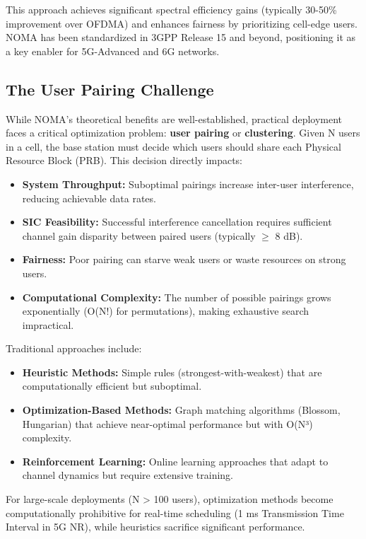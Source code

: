 This approach achieves significant spectral efficiency gains (typically 30-50\% improvement over OFDMA) and enhances fairness by prioritizing cell-edge users. NOMA has been standardized in 3GPP Release 15 and beyond, positioning it as a key enabler for 5G-Advanced and 6G networks.

\subsection{The User Pairing Challenge}

While NOMA's theoretical benefits are well-established, practical deployment faces a critical optimization problem: \textbf{user pairing} or \textbf{clustering}. Given N users in a cell, the base station must decide which users should share each Physical Resource Block (PRB). This decision directly impacts:

\begin{itemize}
    \item \textbf{System Throughput:} Suboptimal pairings increase inter-user interference, reducing achievable data rates.
    \item \textbf{SIC Feasibility:} Successful interference cancellation requires sufficient channel gain disparity between paired users (typically $\geq$ 8 dB).
    \item \textbf{Fairness:} Poor pairing can starve weak users or waste resources on strong users.
    \item \textbf{Computational Complexity:} The number of possible pairings grows exponentially (O(N!) for permutations), making exhaustive search impractical.
\end{itemize}

Traditional approaches include:
\begin{itemize}
    \item \textbf{Heuristic Methods:} Simple rules (strongest-with-weakest) that are computationally efficient but suboptimal.
    \item \textbf{Optimization-Based Methods:} Graph matching algorithms (Blossom, Hungarian) that achieve near-optimal performance but with O(N³) complexity.
    \item \textbf{Reinforcement Learning:} Online learning approaches that adapt to channel dynamics but require extensive training.
\end{itemize}

For large-scale deployments (N > 100 users), optimization methods become computationally prohibitive for real-time scheduling (1 ms Transmission Time Interval in 5G NR), while heuristics sacrifice significant performance.

